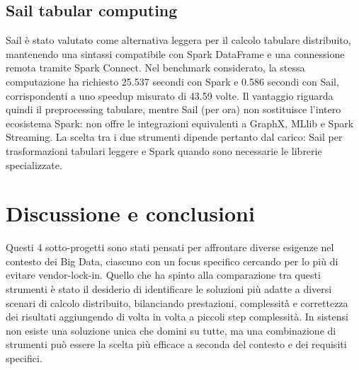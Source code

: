 \documentclass{article}
\begin{document}
\subsection{Sail tabular computing}
Sail è stato valutato come alternativa leggera per il calcolo tabulare %
distribuito, mantenendo una sintassi compatibile %
con Spark DataFrame e una connessione remota tramite %
Spark Connect. Nel benchmark considerato, la stessa computazione %
ha richiesto 25.537 secondi con Spark e 0.586 secondi con Sail, %
corrispondenti a uno speedup misurato di 43.59 volte. %
Il vantaggio riguarda quindi il preprocessing tabulare, mentre Sail (per ora) %
non sostituisce l'intero ecosistema Spark: non offre %
le integrazioni equivalenti a GraphX, MLlib e Spark Streaming. La %
scelta tra i due strumenti dipende pertanto dal carico: %
Sail per trasformazioni tabulari leggere e Spark quando sono necessarie le librerie specializzate.


\section{Discussione e conclusioni}
Questi 4 sotto-progetti sono stati pensati per affrontare diverse %
esigenze nel contesto dei Big Data, ciascuno con un focus %
specifico cercando per lo più di evitare vendor-lock-in. %
Quello che ha spinto alla comparazione tra questi strumenti è stato %
il desiderio di identificare le soluzioni più adatte a diversi %
scenari di calcolo distribuito, bilanciando prestazioni, %
complessità e correttezza dei risultati aggiungendo di volta in volta a piccoli step %
complessità. %
In sistensi non esiste una soluzione unica che domini su tutte, ma %
una combinazione di strumenti può essere la scelta più efficace a %
seconda del contesto e dei requisiti specifici.

\newpage
{}


\end{document}
